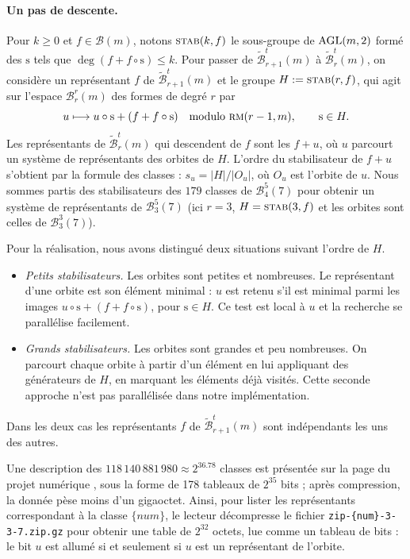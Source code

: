 \documentclass[11pt,a4paper]{article}
\def\bst(#1,#2,#3){\mathcal{B}_{#1}^{#2}(#3)}
\def\clst(#1,#2,#3){\tilde{\mathcal{B}}_{#1}^{#2}(#3)}
\def\AGL(#1,#2){ {\rm AGL}(#1,#2) }
\def\agl#1{ {\mathrm #1 }}
\def\rmc(#1,#2){ \textsc {rm}(#1,#2) }
\def\stab(#1,#2){ \textsc {stab}(#1,#2) }
\def\boole(#1){\mathcal{B}(#1)}
\def\gzip(#1){\texttt{zip-\{#1\}-3-3-7.zip.gz}}
\def\numero(#1){\{#1\}}
\theoremstyle{plain}
\theoremstyle{definition}
\theoremstyle{remark}
\begin{document}
\paragraph{Un pas de descente.}
Pour $k\ge 0$ et $f\in\boole(m)$, notons $\stab(k,f)$ le sous-groupe de $\AGL(m,2)$
formé des $\agl s$ tels que $\deg(f+f\circ\agl s)\le k$. Pour passer de
$\clst(r+1,t,m)$ à $\clst(r,t,m)$, on considère un représentant $f$ de
$\clst(r+1,t,m)$ et le groupe $H:=\stab(r,f)$, qui agit sur l'espace $\bst(r,r,m)$
des formes de degré $r$ par
$$
u\longmapsto u\circ\agl s+(f+f\circ\agl s)\quad\text{modulo }\rmc(r-1,m),\qquad \agl s\in H.
$$
Les représentants de $\clst(r,t,m)$ qui descendent de $f$ sont les $f+u$, où $u$
parcourt un système de représentants des orbites de $H$. L'ordre du stabilisateur de
$f+u$ s'obtient par la formule des classes : $s_u=|H|/|O_u|$, où $O_u$ est
l'orbite de $u$. Nous sommes partis des stabilisateurs des $179$ classes de
$\bst(4,5,7)$ pour obtenir un système de représentants de $\bst(3,5,7)$
(ici $r=3$, $H=\stab(3,f)$ et les orbites sont celles de $\bst(3,3,7)$).

Pour la réalisation, nous avons distingué deux situations suivant l'ordre de $H$.
\begin{itemize}
\item \emph{Petits stabilisateurs.} Les orbites sont petites et nombreuses. Le
  représentant d'une orbite est son élément minimal : $u$ est retenu s'il est
  minimal parmi les images $u\circ\agl s+(f+f\circ\agl s)$, pour $\agl s\in H$. Ce test est
  local à $u$ et la recherche se parallélise facilement.
\item \emph{Grands stabilisateurs.} Les orbites sont grandes et peu nombreuses. On
  parcourt chaque orbite à partir d'un élément en lui appliquant des
  générateurs de $H$, en marquant les éléments déjà visités. Cette
  seconde approche n'est pas parallélisée dans notre implémentation.
\end{itemize}
Dans les deux cas les représentants $f$ de $\clst(r+1,t,m)$ sont indépendants les uns
des autres.

Une description des $118\,140\,881\,980\approx 2^{36.78}$ classes est présentée
sur la page du projet numérique \cite{GL26}, sous la forme de 178 tableaux de
$2^{35}$ bits ; après compression, la donnée pèse moins d'un gigaoctet.
Ainsi, pour lister les représentants correspondant à la classe $\numero(num)$,
le lecteur décompresse le fichier \gzip(num) pour obtenir une table de
$2^{32}$ octets, lue comme un tableau de bits : le bit $u$ est allumé si et
seulement si $u$ est un représentant de l'orbite.
\end{document}
